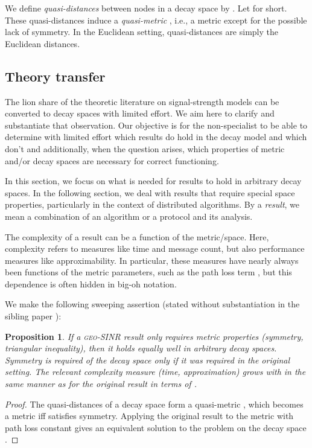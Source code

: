 \documentclass[11pt]{amsart}
\newcounter{foo}
\newtheorem{proposition}[foo]{Proposition}
\newcommand{\geomodel}{\textsc{geo-SINR}}
\begin{document}
We define \emph{quasi-distances} between nodes in a decay space 
by . Let  for short.
These quasi-distances induce a \emph{quasi-metric} 
, i.e., a metric except for the possible lack of symmetry.
In the Euclidean setting, quasi-distances are simply the Euclidean distances.



\subsection{Theory transfer}
\label{sec:theorytransfer}

The lion share of the theoretic literature on signal-strength models
can be converted to decay spaces with limited effort.
We aim here to clarify and substantiate that observation.
Our objective is for the non-specialist to be able to determine with
limited effort which results do hold in the decay model and which don't and additionally, when the question arises, which properties of metric
and/or decay spaces are necessary for correct functioning.

In this section, we focus on what is needed for results to hold in
arbitrary decay spaces. In the following section, we deal with results that require special space properties, particularly in the context of distributed algorithms.
By a \emph{result}, we mean a combination of an algorithm or a protocol and its
analysis.

The complexity of a result can be a function of the metric/space.
Here, complexity refers to measures like time and message count, 
but also performance
measures like approximability. In particular, these measures have
nearly always been functions of the metric parameters, such as the
path loss term , but this dependence is often hidden in big-oh notation.

We make the following sweeping assertion (stated without substantiation
in the sibling paper \cite{us:ICDCS14}):

\begin{proposition}
  If a {\geomodel} result only requires metric properties (symmetry, triangular
  inequality), then it holds equally well in arbitrary decay spaces.  Symmetry
  is required of the decay space only if it was required in the
  original setting.  The relevant complexity measure (time,
  approximation) grows with  in the same manner as for the
  original result in terms of .
\label{prop:metric}
\end{proposition}

\begin{proof}
The quasi-distances  of a decay space 
form a quasi-metric , which becomes a metric 
iff  satisfies symmetry. 
Applying the original result to the metric  with path
loss constant  gives an equivalent solution to the problem
on the decay space .
\end{proof}
\end{document}
